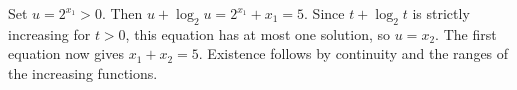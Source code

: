 Set $u=2^{x_1}>0$. Then $u+\log_2u=2^{x_1}+x_1=5$. Since $t+\log_2t$ is strictly increasing for $t>0$, this equation has at most one solution, so $u=x_2$. The first equation now gives $\boxed{x_1+x_2=5}$. Existence follows by continuity and the ranges of the increasing functions.
